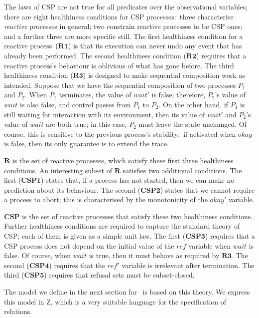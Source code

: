 \documentclass{article}
\newcommand{\healthiness}[1]{\mathbf{#1}}
\begin{document}
The laws of CSP are not true for all predicates over the observational
variables; there are eight healthiness conditions for CSP
processes:~three characterise \emph{reactive} processes in general;
two constrain reactive processes to be CSP ones; and a further three
are more specific still.  The first healthiness condition for a
reactive process~($\healthiness{R1}$) is that its execution can never
undo any event that has already been performed.  The second
healthiness condition ($\healthiness{R2}$) requires that a reactive
process's behaviour is oblivious of what has gone before.  The third
healthiness condition ($\healthiness{R3}$) is designed to make
sequential composition work as intended.  Suppose that we have the
sequential composition of two processes $P_1$ and $P_2$.  When $P_1$
terminates, the value of $wait'$ is false; therefore, $P_2$'s value of
$wait$ is also false, and control passes from $P_1$ to $P_2$.  On the
other hand, if $P_1$ is still waiting for interaction with its
environment, then its value of $wait'$ and $P_2$'s value of $wait$ are
both true; in this case, $P_2$ must leave the state unchanged.  Of
course, this is sensitive to the previous process's stability:~if
activated when $okay$ is false, then its only guarantee is to extend
the trace.

$\healthiness{R}$ is the set of reactive processes, which satisfy
these first three healthiness conditions.  An interesting subset of
$\healthiness{R}$ satisfies two additional conditions.  The first
($\healthiness{CSP1}$) states that, if a process has not started, then
we can make no prediction about its behaviour.  The second
($\healthiness{CSP2}$) states that we cannot require a process to
abort; this is characterised by the monotonicity of the $okay'$
variable.

$\healthiness{CSP}$ is the set of reactive processes that satisfy
these two healthiness conditions.  Further healthiness conditions are
required to capture the standard theory of CSP; each of them is given
as a simple unit law.  The first ($\healthiness{CSP3}$) requires that
a CSP process does not depend on the initial value of the $ref$
variable when $wait$ is false.  Of course, when $wait$ is true, then
it must behave as required by $\healthiness{R3}$.  The second
($\healthiness{CSP4}$) requires that the $ref'$ variable is irrelevant
after termination.  The third ($\healthiness{CSP5}$) requires that
refusal sets must be subset-closed.

The model we define in the next section for \Circus\ is based on this
theory.  We express this model in Z, which is a very suitable language
for the specification of relations.
\end{document}

